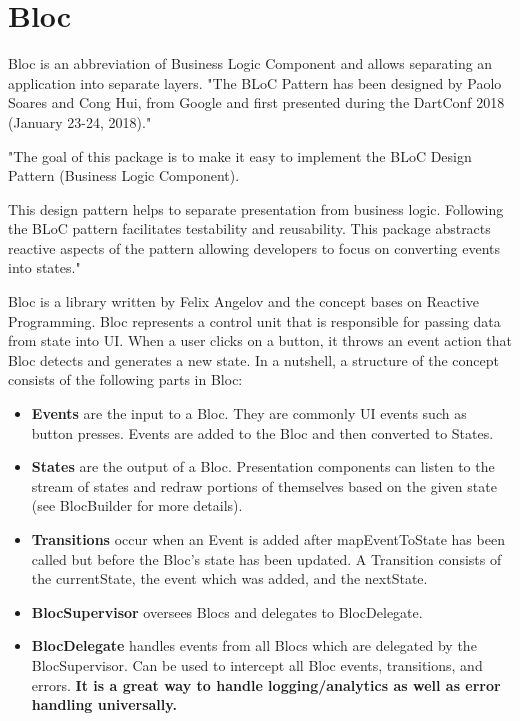 \section{Bloc}\label{sec:bloc}
Bloc is an abbreviation of Business Logic Component and allows separating an application into separate layers.\cite{bloc}
"The BLoC Pattern has been designed by Paolo Soares and Cong Hui, from Google and first presented during the DartConf 2018 (January 23-24, 2018)."\cite{didierboelens}

"The goal of this package is to make it easy to implement the BLoC Design Pattern (Business Logic Component).

This design pattern helps to separate presentation from business logic.
Following the BLoC pattern facilitates testability and reusability.
This package abstracts reactive aspects of the pattern allowing developers to focus on converting events into states."\cite{bloc}

Bloc is a library written by Felix Angelov and the concept bases on Reactive Programming.\cite{bloc}
Bloc represents a control unit that is responsible for passing data from state into UI.
When a user clicks on a button, it throws an event action that Bloc detects and generates a new state.
In a nutshell, a structure of the concept consists of the following parts in Bloc:
\begin{itemize}
    \item \textbf{Events} are the input to a Bloc.
    They are commonly UI events such as button presses.
    Events are added to the Bloc and then converted to States.
    \item \textbf{States} are the output of a Bloc.
    Presentation components can listen to the stream of states and redraw portions of themselves based on the given state (see BlocBuilder for more details).
    \item \textbf{Transitions} occur when an Event is added after mapEventToState has been called but before the Bloc's state has been updated.
    A Transition consists of the currentState, the event which was added, and the nextState.
    \item \textbf{BlocSupervisor} oversees Blocs and delegates to BlocDelegate.
    \item \textbf{BlocDelegate} handles events from all Blocs which are delegated by the BlocSupervisor.
    Can be used to intercept all Bloc events, transitions, and errors.
    \textbf{It is a great way to handle logging/analytics as well as error handling universally.}\cite{bloc}
\end{itemize}


